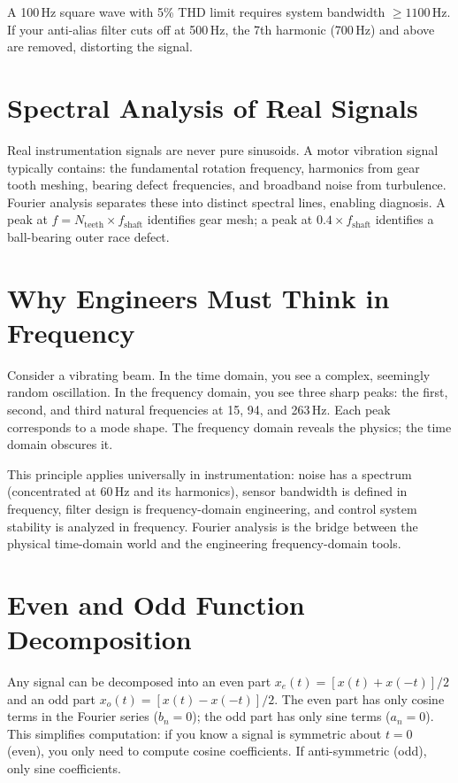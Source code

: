 \documentclass[11pt,letterpaper,twoside,openany]{book}
\begin{document}
A 100\,Hz square wave with 5\% THD limit requires system bandwidth $\geq 1100$\,Hz. If your anti-alias filter cuts off at 500\,Hz, the 7th harmonic (700\,Hz) and above are removed, distorting the signal.

\section{Spectral Analysis of Real Signals}
Real instrumentation signals are never pure sinusoids. A motor vibration signal typically contains: the fundamental rotation frequency, harmonics from gear tooth meshing, bearing defect frequencies, and broadband noise from turbulence. Fourier analysis separates these into distinct spectral lines, enabling diagnosis. A peak at $f = N_{\text{teeth}} \times f_{\text{shaft}}$ identifies gear mesh; a peak at $0.4 \times f_{\text{shaft}}$ identifies a ball-bearing outer race defect.
\section{Why Engineers Must Think in Frequency}
Consider a vibrating beam. In the time domain, you see a complex, seemingly random oscillation. In the frequency domain, you see three sharp peaks: the first, second, and third natural frequencies at 15, 94, and 263\,Hz. Each peak corresponds to a mode shape. The frequency domain reveals the physics; the time domain obscures it.

This principle applies universally in instrumentation: noise has a spectrum (concentrated at 60\,Hz and its harmonics), sensor bandwidth is defined in frequency, filter design is frequency-domain engineering, and control system stability is analyzed in frequency. Fourier analysis is the bridge between the physical time-domain world and the engineering frequency-domain tools.

\section{Even and Odd Function Decomposition}
Any signal can be decomposed into an even part $x_e(t) = [x(t) + x(-t)]/2$ and an odd part $x_o(t) = [x(t) - x(-t)]/2$. The even part has only cosine terms in the Fourier series ($b_n = 0$); the odd part has only sine terms ($a_n = 0$). This simplifies computation: if you know a signal is symmetric about $t = 0$ (even), you only need to compute cosine coefficients. If anti-symmetric (odd), only sine coefficients.
\end{document}
